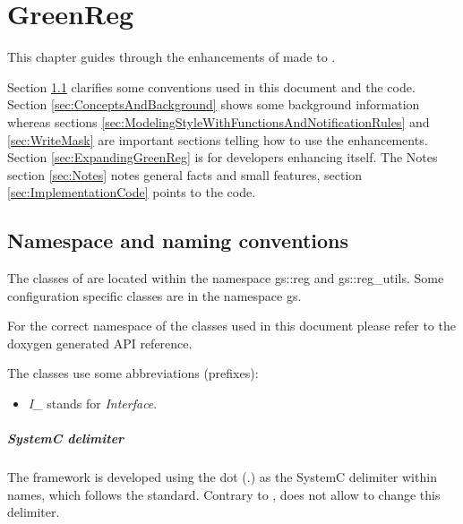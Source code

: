 
\cleardoublepage
\chapter{GreenReg}
\label{GreenReg}

This chapter guides through the enhancements of \GreenReg made to \DRF.

Section \ref{sec:NamespaceAndNamingConventions} clarifies some conventions used in this document and the code. Section \ref{sec:ConceptsAndBackground} shows some background information whereas sections \ref{sec:ModelingStyleWithFunctionsAndNotificationRules} and \ref{sec:WriteMask} are important sections telling how to use the \GreenReg enhancements. Section \ref{sec:ExpandingGreenReg} is for developers enhancing \GreenReg itself. The Notes section \ref{sec:Notes} notes general \GreenReg facts and small features, section \ref{sec:ImplementationCode} points to the code.

\section{Namespace and naming conventions}
\label{sec:NamespaceAndNamingConventions}
The \DRF classes of \GreenReg are located within the namespace {\sffamily gs::reg} and {\sffamily gs::reg\_utils}. Some configuration specific classes are in the namespace {\sffamily gs}.

For the correct namespace of the classes used in this document please
refer to the doxygen generated API reference.

The \GreenReg classes use some abbreviations (prefixes):
\begin{itemize}
	\item \emph{I\_} stands for {\em Interface}.
\end{itemize}

\paragraph{SystemC delimiter} The \GreenReg framework is developed using the dot ({\sffamily .}) as the SystemC delimiter within names, which follows the standard. Contrary to \GreenControl, \GreenReg does not allow to change this delimiter.

